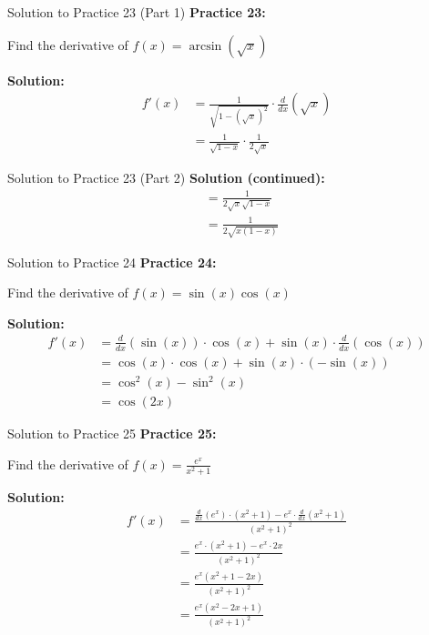 \documentclass[aspectratio=169]{beamer}
\begin{document}
\begin{frame}{Solution to Practice 23 (Part 1)}
\textbf{Practice 23:}

Find the derivative of $f(x) = \arcsin(\sqrt{x})$

\textbf{Solution:}
\[
\begin{aligned}
  f'(x) &= \frac{1}{\sqrt{1 - (\sqrt{x})^2}} \cdot \frac{d}{dx}(\sqrt{x}) \\
  &= \frac{1}{\sqrt{1 - x}} \cdot \frac{1}{2\sqrt{x}}
\end{aligned}
\]
\end{frame}

\begin{frame}{Solution to Practice 23 (Part 2)}
\textbf{Solution (continued):}
\[
\begin{aligned}
  &= \frac{1}{2\sqrt{x}\sqrt{1 - x}} \\
  &= \frac{1}{2\sqrt{x(1 - x)}}
\end{aligned}
\]
\end{frame}

\begin{frame}{Solution to Practice 24}
\textbf{Practice 24:}

Find the derivative of $f(x) = \sin(x) \cos(x)$

\textbf{Solution:}
\[
\begin{aligned}
  f'(x) &= \frac{d}{dx}(\sin(x)) \cdot \cos(x) + \sin(x) \cdot \frac{d}{dx}(\cos(x)) \\
  &= \cos(x) \cdot \cos(x) + \sin(x) \cdot (-\sin(x)) \\
  &= \cos^2(x) - \sin^2(x) \\
  &= \cos(2x)
\end{aligned}
\]
\end{frame}

\begin{frame}{Solution to Practice 25}
\textbf{Practice 25:}

Find the derivative of $f(x) = \frac{e^x}{x^2 + 1}$

\textbf{Solution:}
\[
\begin{aligned}
  f'(x) &= \frac{\frac{d}{dx}(e^x) \cdot (x^2 + 1) - e^x \cdot \frac{d}{dx}(x^2 + 1)}{(x^2 + 1)^2} \\
  &= \frac{e^x \cdot (x^2 + 1) - e^x \cdot 2x}{(x^2 + 1)^2} \\
  &= \frac{e^x(x^2 + 1 - 2x)}{(x^2 + 1)^2} \\
  &= \frac{e^x(x^2 - 2x + 1)}{(x^2 + 1)^2}
\end{aligned}
\]
\end{frame}
\end{document}
